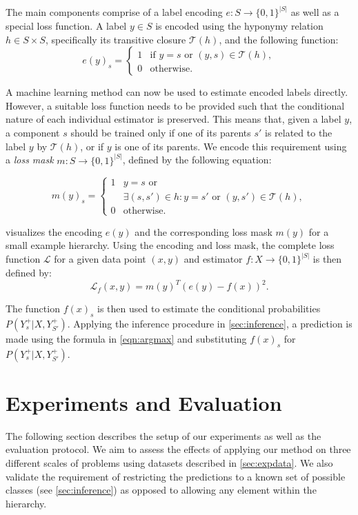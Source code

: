 \documentclass[10pt,twocolumn,letterpaper]{article}
\begin{document}
The main components comprise of a label encoding $e: S \to \{0,1\}^{|S|}$ as well as a special loss function.
A label $y \in S$ is encoded using the hyponymy relation $h \in S \times S$, specifically its transitive
closure $\mathcal{T}(h)$, and the following function:
\begin{equation}
e(y)_s = \begin{cases}
1 & \text{if }y = s\text{ or }(y,s) \in \mathcal{T}(h),\\
0 & \text{otherwise}. 
\end{cases}
\end{equation}

A machine learning method can now be used to estimate encoded labels directly. However,
a suitable loss function needs to be provided such that the conditional nature of each
individual estimator is preserved. This means that, given a label $y$, a component $s$ should be trained only
if one of its parents $s'$ is related to the label $y$ by $\mathcal{T}(h)$, or if $y$ is one of its parents.
We encode this requirement using a \emph{loss mask} $m: S \to \{0,1\}^{|S|}$, defined by the
following equation:

\begin{equation}
m(y)_s = \begin{cases}
1 & \text{$y=s$ or} \\
 & \exists (s,s') \in h: y = s' \text{ or }(y,s') \in \mathcal{T}(h),\\
0 & \text{otherwise}. 
\end{cases}
\end{equation}

 visualizes the encoding $e(y)$ and the corresponding loss mask $m(y)$ for a
small example hierarchy. Using the encoding and loss mask, the
complete loss function $\mathcal{L}$ for a given data point $(x,y)$ and estimator $f: X \to \{0,1\}^{|S|}$ is then defined
by:
\begin{equation}
\mathcal{L}_f(x,y) = m(y)^T(e(y) - f(x))^2.
\end{equation}

The function $f(x)_s$ is then used to estimate the conditional probabilities $P(Y_s^+|X, Y_{S'}^+)$.
Applying the inference procedure in \cref{sec:inference}, a prediction is made
using the formula in \cref{eqn:argmax} and substituting $f(x)_s$ for $P(Y_s^+|X, Y_{S'}^+)$.

\section{Experiments and Evaluation}
The following section describes the setup of our experiments as well as the evaluation protocol.
We aim to assess the effects of applying our method on three different scales of problems using datasets
described in \cref{sec:expdata}. We also validate the requirement of restricting the predictions to
a known set of possible classes (see \cref{sec:inference}) as opposed to allowing any element within the hierarchy.
\end{document}
